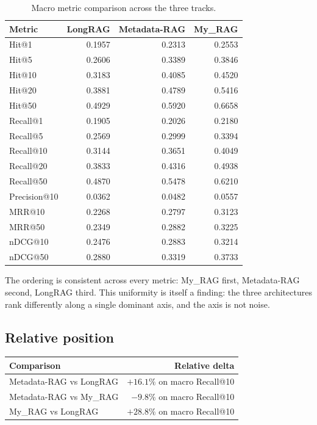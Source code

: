 \documentclass[11pt,a4paper]{article}
\begin{document}
\begin{table}[h]
\centering
\caption{Macro metric comparison across the three tracks.}
\label{tab:full}
\small
\begin{tabular}{l r r r}
\toprule
\textbf{Metric} & \textbf{LongRAG} & \textbf{Metadata-RAG}
  & \textbf{My\_RAG} \\
\midrule
Hit@1     & \num{0.1957} & \num{0.2313} & \num{0.2553} \\
Hit@5     & \num{0.2606} & \num{0.3389} & \num{0.3846} \\
Hit@10    & \num{0.3183} & \num{0.4085} & \num{0.4520} \\
Hit@20    & \num{0.3881} & \num{0.4789} & \num{0.5416} \\
Hit@50    & \num{0.4929} & \num{0.5920} & \num{0.6658} \\
Recall@1  & \num{0.1905} & \num{0.2026} & \num{0.2180} \\
Recall@5  & \num{0.2569} & \num{0.2999} & \num{0.3394} \\
Recall@10 & \num{0.3144} & \num{0.3651} & \num{0.4049} \\
Recall@20 & \num{0.3833} & \num{0.4316} & \num{0.4938} \\
Recall@50 & \num{0.4870} & \num{0.5478} & \num{0.6210} \\
Precision@10 & \num{0.0362} & \num{0.0482} & \num{0.0557} \\
MRR@10    & \num{0.2268} & \num{0.2797} & \num{0.3123} \\
MRR@50    & \num{0.2349} & \num{0.2882} & \num{0.3225} \\
nDCG@10   & \num{0.2476} & \num{0.2883} & \num{0.3214} \\
nDCG@50   & \num{0.2880} & \num{0.3319} & \num{0.3733} \\
\bottomrule
\end{tabular}
\end{table}

The ordering is consistent across every metric: My\_RAG first,
Metadata-RAG second, LongRAG third. This uniformity is itself a
finding: the three architectures rank differently along a single
dominant axis, and the axis is not noise.

\subsection{Relative position}
\begin{center}
\small
\begin{tabular}{l r}
\toprule
\textbf{Comparison} & \textbf{Relative delta} \\
\midrule
Metadata-RAG vs LongRAG & $+16.1\%$ on macro Recall@10 \\
Metadata-RAG vs My\_RAG & $-9.8\%$ on macro Recall@10 \\
My\_RAG vs LongRAG & $+28.8\%$ on macro Recall@10 \\
\bottomrule
\end{tabular}
\end{center}
\end{document}
